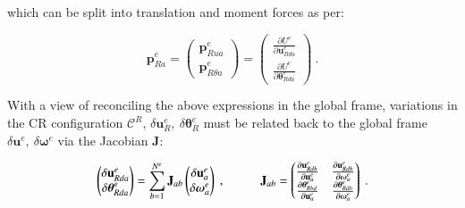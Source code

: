 which can be split into translation and moment forces as per:

\begin{equation} 
\mathbf{p}_{Ra}^e = 
\begin{pmatrix}
\mathbf{p}_{Rua}^e \\
\mathbf{p}_{R\theta a}^e 
\end{pmatrix}
=
\begin{pmatrix}
\frac{\partial U^e}{\partial \mathbf{u}_{Rda}^e} \\
\frac{\partial U^e}{\partial \boldsymbol{\theta}_{Rda}^e} 
\end{pmatrix}
\label{eq_cr5}\ .
\end{equation}

With a view of reconciling the above expressions in the global frame, variations in the CR configuration $\mathscr{C}^R$, $\delta \mathbf{u}_{R}^e,\ \delta \boldsymbol{\theta}_{R}^e$ must be related back to the global frame $\delta \mathbf{u}^e,\ \delta \boldsymbol{\omega}^e$ via the Jacobian $\mathbf{J}$:

\begin{equation} 
\begin{pmatrix}
\delta \mathbf{u}_{Rda}^e \\
\delta \boldsymbol{\theta}_{Rda}^e
\end{pmatrix}
=
\sum_{b=1}^{N^e}
\mathbf{J}_{ab}
\begin{pmatrix}
\delta \mathbf{u}_a^e \\
\delta \boldsymbol{\omega}_a^e
\end{pmatrix}\ ,
\hspace{10mm}
\mathbf{J}_{ab} = 
\begin{pmatrix}
\frac{\partial \mathbf{u}_{Rdb}^e}{\partial \mathbf{u}_a^e} & \frac{\partial \mathbf{u}_{Rdb}^e}{\partial \boldsymbol{\omega}_a^e} \\
\frac{\partial \boldsymbol{\theta}_{Rbd}^e}{\partial \mathbf{u}_a^e} & \frac{\partial \boldsymbol{\theta}_{Rdb}^e}{\partial \boldsymbol{\omega}_a^e}
\end{pmatrix}
\label{eq_cr6}\ .
\end{equation}

